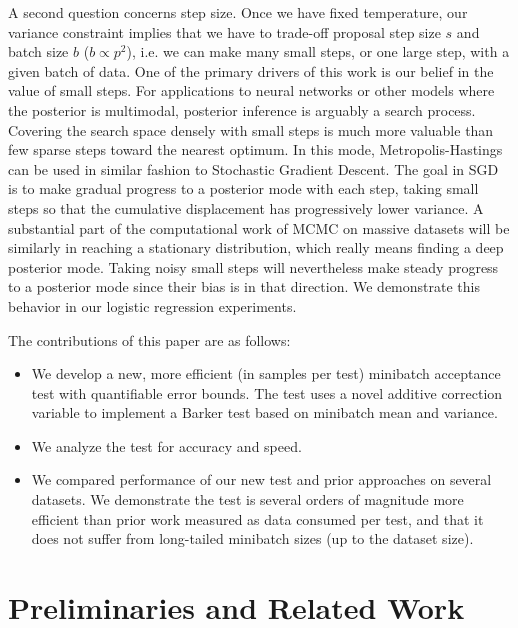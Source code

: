 \documentclass[twoside]{article} \usepackage{aistats2017}
\begin{document}
A second question concerns step size. Once we have fixed temperature,
our variance constraint implies that we have to trade-off proposal
step size $s$ and batch size $b$ ($b \propto p^2$), i.e. we can make
many small steps, or one large step, with a given batch of data. One
of the primary drivers of this work is our belief in the value of
small steps. For applications to neural networks or other models where
the posterior is multimodal, posterior inference is arguably a search
process. Covering the search space densely with small steps is much
more valuable than few sparse steps toward the nearest optimum. In
this mode, Metropolis-Hastings can be used in similar fashion to
Stochastic Gradient Descent. The goal in SGD is to make gradual
progress to a posterior mode with each step, taking small steps so
that the cumulative displacement has progressively lower variance. A
substantial part of the computational work of MCMC on massive datasets
will be similarly in reaching a stationary distribution, which really
means finding a deep posterior mode. Taking noisy small steps will
nevertheless make steady progress to a posterior mode since their bias
is in that direction. We demonstrate this behavior in our logistic regression
experiments.

The contributions of this paper are as follows:

\begin{itemize}
\item We develop a new, more efficient (in samples per test) minibatch acceptance test with quantifiable error bounds. The test
  uses a novel additive correction variable to implement a Barker test based on minibatch mean and variance. 
\item We analyze the test for accuracy and speed.
\item We compared performance of our new test and prior approaches on several datasets. We demonstrate the test is several orders
  of magnitude more efficient than prior work measured as data consumed per test, and that it does not suffer
  from long-tailed minibatch sizes (up to the dataset size). 
\end{itemize}



\section{Preliminaries and Related Work}\label{sec:related_work}
\end{document}
